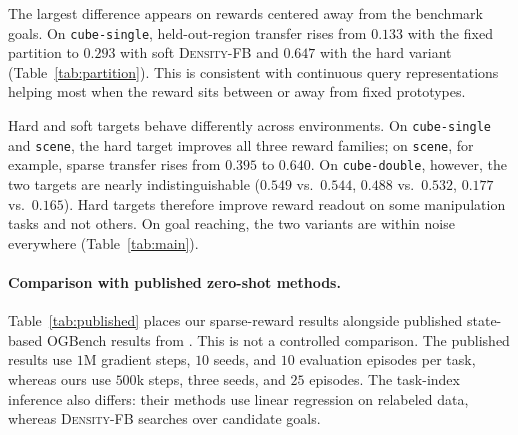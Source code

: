 \documentclass{article}
\newcommand{\DensityFB}{\textsc{Density-FB}}
\begin{document}
The largest difference appears on rewards centered away from the benchmark goals.
On \texttt{cube-single}, held-out-region transfer rises from $0.133$ with the fixed partition to $0.293$ with soft \DensityFB{} and $0.647$ with the hard variant (Table~\ref{tab:partition}).
This is consistent with continuous query representations helping most when the reward sits between or away from fixed prototypes.

Hard and soft targets behave differently across environments.
On \texttt{cube-single} and \texttt{scene}, the hard target improves all three reward families; on \texttt{scene}, for example, sparse transfer rises from $0.395$ to $0.640$.
On \texttt{cube-double}, however, the two targets are nearly indistinguishable ($0.549$ vs.\ $0.544$, $0.488$ vs.\ $0.532$, $0.177$ vs.\ $0.165$).
Hard targets therefore improve reward readout on some manipulation tasks and not others.
On goal reaching, the two variants are within noise everywhere (Table~\ref{tab:main}).

\paragraph{Comparison with published zero-shot methods.}
Table~\ref{tab:published} places our sparse-reward results alongside published state-based OGBench results from \citet{bagatella-iclr26a}.
This is not a controlled comparison.
The published results use $1$M gradient steps, $10$ seeds, and $10$ evaluation episodes per task, whereas ours use $500$k steps, three seeds, and $25$ episodes.
The task-index inference also differs: their methods use linear regression on relabeled data, whereas \DensityFB{} searches over candidate goals.
\end{document}
